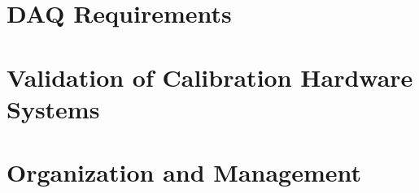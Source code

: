 
%



\section{DAQ Requirements}
\label{sec:sp-calib-daqreq}
 


\section{Validation of Calibration Hardware Systems}
\label{sec:sp-calib-val}



\section{Organization and Management}
\label{sec:sp-calib-org}

